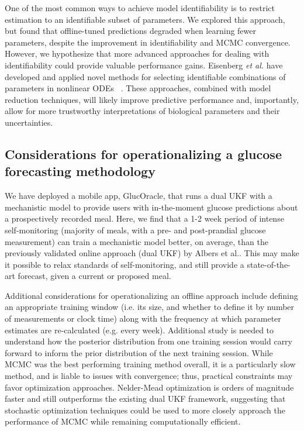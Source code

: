 \documentclass[10pt,letterpaper]{article}
\begin{document}
One of the most common ways to achieve model identifiability is to restrict estimation to an identifiable subset of parameters. We explored this approach, but found that offline-tuned predictions degraded when learning fewer parameters, despite the improvement in identifiability and MCMC convergence. However, we hypothesize that more advanced approaches for dealing with identifiability could provide valuable performance gains. Eisenberg \emph{et al.} have developed and applied novel methods for selecting identifiable combinations of parameters in nonlinear ODEs ~\cite{meshkat_algorithm_2009,eisenberg_identifiability_2013,eisenberg_determining_2014}. These approaches, combined with model reduction techniques, will likely improve predictive performance and, importantly, allow for more trustworthy interpretations of biological parameters and their uncertainties.


\subsection{Considerations for operationalizing a glucose forecasting methodology}
We have deployed a mobile app, GlucOracle, that runs a dual UKF with a mechanistic model to provide users with in-the-moment glucose predictions about a prospectively recorded meal.
Here, we find that a 1-2 week period of intense self-monitoring (majority of meals, with a pre- and post-prandial glucose measurement) can train a mechanistic model better, on average, than the previously validated online approach (dual UKF) by Albers et al.. This may make it possible to relax standards of self-monitoring, and still provide a state-of-the-art forecast, given a current or proposed meal.

Additional considerations for operationalizing an offline approach include defining an appropriate training window (i.e. its size, and whether to define it by number of measurements or clock time) along with the frequency at which parameter estimates are re-calculated (e.g. every week). Additional study is needed to understand how the posterior distribution from one training session would carry forward to inform the prior distribution of the next training session. While MCMC was the best performing training method overall, it is a particularly slow method, and is liable to issues with convergence; thus, practical constraints may favor optimization approaches. Nelder-Mead optimization is orders of magnitude faster and still outperforms the existing dual UKF framework, suggesting that stochastic optimization techniques could be used to more closely approach the performance of MCMC while remaining computationally efficient.
\end{document}
